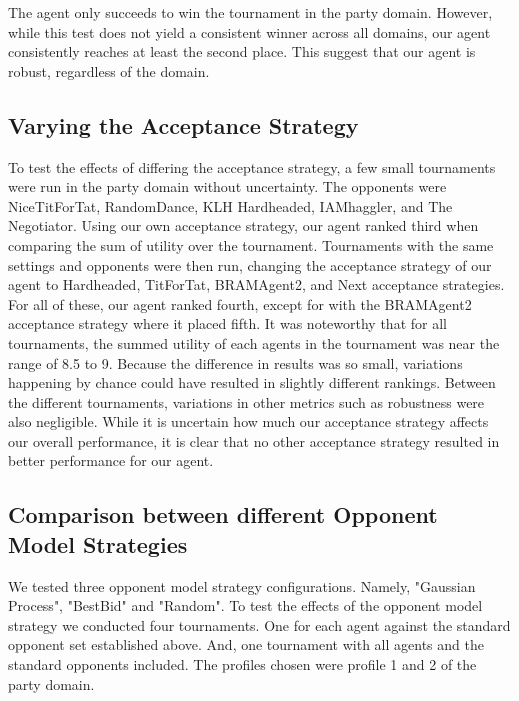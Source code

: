 \documentclass[a4paper,11pt]{article}
\theoremstyle{mytheor}
\begin{document}
The agent only succeeds to win the tournament in the party domain. However, while this test does not yield a consistent winner across all domains, our agent consistently reaches at least the second place. This suggest that our agent is robust, regardless of the domain. 

\subsection{Varying the Acceptance Strategy}
To test the effects of differing the acceptance strategy, a few small tournaments were run in the party domain without uncertainty. The opponents were NiceTitForTat, RandomDance, KLH Hardheaded, IAMhaggler, and The Negotiator. Using our own acceptance strategy, our agent ranked third when comparing the sum of utility over the tournament. Tournaments with the same settings and opponents were then run, changing the acceptance strategy of our agent to Hardheaded, TitForTat, BRAMAgent2, and Next acceptance strategies. For all of these, our agent ranked fourth, except for with the BRAMAgent2 acceptance strategy where it placed fifth. It was noteworthy that for all tournaments, the summed utility of each agents in the tournament was near the range of 8.5 to 9. Because the difference in results was so small, variations happening by chance could have resulted in slightly different rankings. Between the different tournaments, variations in other metrics such as robustness were also negligible. While it is uncertain how much our acceptance strategy affects our overall performance, it is clear that no other acceptance strategy resulted in better performance for our agent.

\subsection{Comparison between different Opponent Model Strategies}
We tested three opponent model strategy configurations. Namely, "Gaussian Process", "BestBid" and "Random". To test the effects of the opponent model strategy we conducted four tournaments. One for each agent against the standard opponent set established above. And, one tournament with all agents and the standard opponents included. The profiles chosen were profile 1 and 2 of the party domain. 
\end{document}
